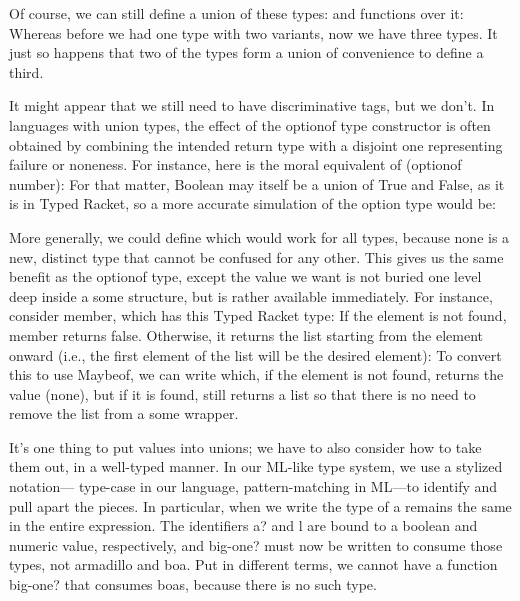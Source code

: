 Of course, we can still define a union of these types:
and functions over it:
Whereas before we had one type with two variants, now we have three types. It
just so happens that two of the types form a union of convenience to define a
third.


It might appear that we still need to have discriminative tags, but we don’t. In
languages with union types, the effect of the optionof type constructor is often
obtained by combining the intended return type with a disjoint one representing
failure or noneness. For instance, here is the moral equivalent of (optionof
number):
For that matter, Boolean may itself be a union of True and False, as it is in
Typed Racket, so a more accurate simulation of the option type would be:

More generally, we could define
which would work for all types, because none is a new, distinct type that cannot
be confused for any other. This gives us the same benefit as the optionof type,
except the value we want is not buried one level deep inside a some structure,
but is rather available immediately. For instance, consider member, which has
this Typed Racket type:
If the element is not found, member returns false. Otherwise, it returns the
list starting from the element onward (i.e., the first element of the list will
be the desired element):
To convert this to use Maybeof, we can write
which, if the element is not found, returns the value (none), but if it is
found, still returns a list
so that there is no need to remove the list from a some wrapper.


It’s one thing to put values into unions; we have to also consider how to take
them out, in a well-typed manner. In our ML-like type system, we use a stylized
notation— type-case in our language, pattern-matching in ML—to identify and pull
apart the pieces. In particular, when we write
the type of a remains the same in the entire expression. The identifiers a? and
l are bound to a boolean and numeric value, respectively, and big-one? must now
be written to consume those types, not armadillo and boa. Put in different
terms, we cannot have a function big-one? that consumes boas, because there is
no such type.

